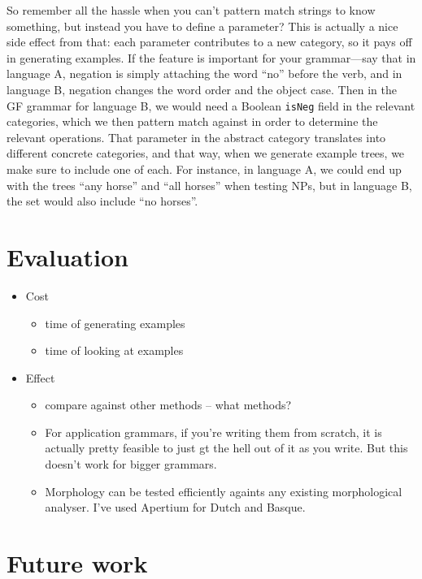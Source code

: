 So remember all the hassle when you can't pattern match strings to
know something, but instead you have to define a parameter? This is
actually a nice side effect from that: each parameter contributes to a
new category, so it pays off in generating examples. If the feature is
important for your grammar---say that in language A, negation is
simply attaching the word  ``no'' before the verb, and in language B,
negation changes the word order and the object case. Then in the GF
grammar for language B, we would need a Boolean \texttt{isNeg} field
in the relevant categories, which we then pattern match against in
order to determine the relevant operations. That parameter in the
abstract category translates into different concrete categories, and
that way, when we generate example trees, we make sure to include one
of each. For instance, in language A, we could end up with the trees
``any horse'' and ``all horses'' when testing NPs, but in language B,
the set would also include ``no horses''. 

\section{Evaluation}


\begin{itemize}
\item Cost
  \begin{itemize}
  \item time of generating examples
  \item time of looking at examples
  \end{itemize}

\item Effect
  \begin{itemize}
  \item compare against other methods -- what methods?
  \item For application grammars, if you're writing them from scratch, it is actually pretty feasible to just gt the hell out of it as you write. But this doesn't work for bigger grammars.
  \item Morphology can be tested efficiently againts any existing morphological analyser. I've used Apertium for Dutch and Basque.
  \end{itemize}
\end{itemize}


\section{Future work}

